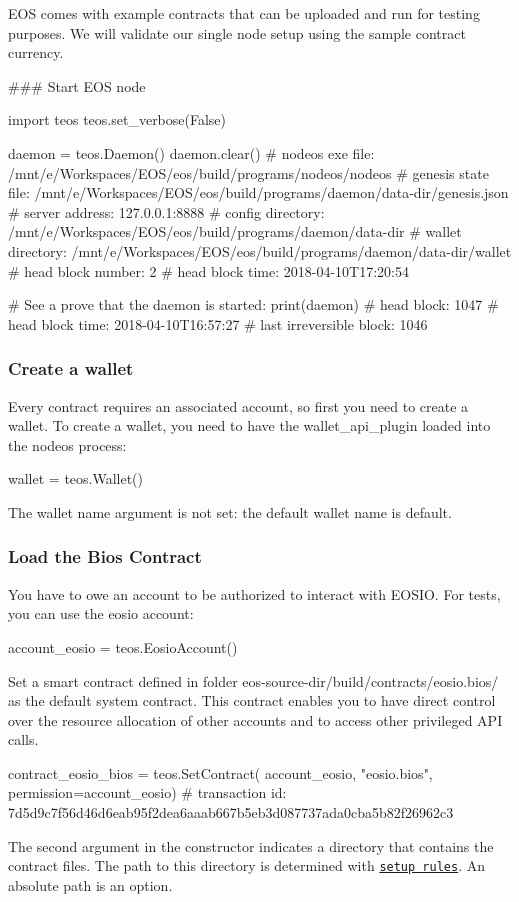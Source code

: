 E\+OS comes with example contracts that can be uploaded and run for testing purposes. We will validate our single node setup using the sample contract \textquotesingle{}currency\textquotesingle{}.

\#\#\# Start E\+OS node 
\begin{DoxyCode}
import teos
teos.set\_verbose(False)

daemon = teos.Daemon()
daemon.clear()
#       nodeos exe file: /mnt/e/Workspaces/EOS/eos/build/programs/nodeos/nodeos
#    genesis state file: /mnt/e/Workspaces/EOS/eos/build/programs/daemon/data-dir/genesis.json
#        server address: 127.0.0.1:8888
#      config directory: /mnt/e/Workspaces/EOS/eos/build/programs/daemon/data-dir
#      wallet directory: /mnt/e/Workspaces/EOS/eos/build/programs/daemon/data-dir/wallet
#     head block number: 2
#       head block time: 2018-04-10T17:20:54

# See a prove that the daemon is started:
print(daemon)
#            head block: 1047
#       head block time: 2018-04-10T16:57:27
#  last irreversible block: 1046
\end{DoxyCode}
 \subsubsection*{Create a wallet}

Every contract requires an associated account, so first you need to create a wallet. To create a wallet, you need to have the wallet\+\_\+api\+\_\+plugin loaded into the nodeos process\+: 
\begin{DoxyCode}
wallet = teos.Wallet()
\end{DoxyCode}
 The wallet name argument is not set\+: the default wallet name is \textquotesingle{}default\textquotesingle{}.

\subsubsection*{Load the Bios Contract}

You have to owe an account to be authorized to interact with E\+O\+S\+IO. For tests, you can use the \textquotesingle{}eosio\textquotesingle{} account\+: 
\begin{DoxyCode}
account\_eosio = teos.EosioAccount()
\end{DoxyCode}
 Set a smart contract defined in folder eos-\/source-\/dir/build/contracts/eosio.\+bios/ as the default system contract. This contract enables you to have direct control over the resource allocation of other accounts and to access other privileged A\+PI calls. 
\begin{DoxyCode}
contract\_eosio\_bios = teos.SetContract(
  account\_eosio, "eosio.bios", permission=account\_eosio)
#        transaction id: 7d5d9c7f56d46d6eab95f2dea6aaab667b5eb3d087737ada0cba5b82f26962c3
\end{DoxyCode}
 The second argument in the constructor indicates a directory that contains the contract files. The path to this directory is determined with \href{#setup}{\tt setup rules}. An absolute path is an option.

